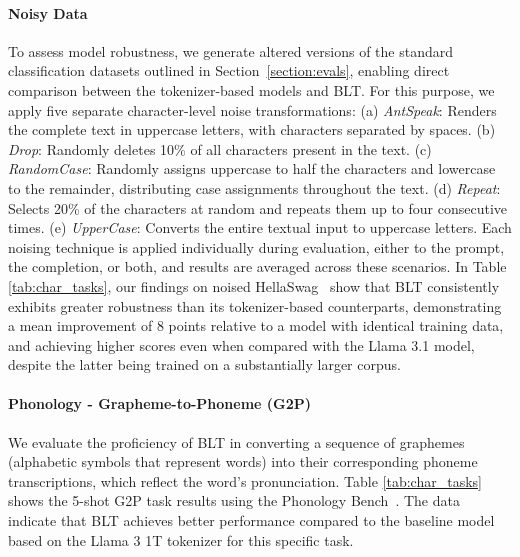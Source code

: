 \paragraph{Noisy Data} To assess model robustness, we generate altered versions of the standard classification datasets outlined in Section~\ref{section:evals}, enabling direct comparison between the tokenizer-based models and {\textsc BLT}. For this purpose, we apply five separate character-level noise transformations: (a) \textit{AntSpeak}: Renders the complete text in uppercase letters, with characters separated by spaces. (b) \textit{Drop}: Randomly deletes 10\% of all characters present in the text. (c) \textit{RandomCase}: Randomly assigns uppercase to half the characters and lowercase to the remainder, distributing case assignments throughout the text. (d) \textit{Repeat}: Selects 20\% of the characters at random and repeats them up to four consecutive times. (e) \textit{UpperCase}: Converts the entire textual input to uppercase letters. Each noising technique is applied individually during evaluation, either to the prompt, the completion, or both, and results are averaged across these scenarios. In Table \ref{tab:char_tasks}, our findings on noised HellaSwag~\citep{Eval_hellaswag} show that {\textsc BLT} consistently exhibits greater robustness than its tokenizer-based counterparts, demonstrating a mean improvement of 8 points relative to a model with identical training data, and achieving higher scores even when compared with the Llama 3.1 model, despite the latter being trained on a substantially larger corpus.

\paragraph{Phonology - Grapheme-to-Phoneme (G2P)} We evaluate the proficiency of {\textsc BLT} in converting a sequence of graphemes (alphabetic symbols that represent words) into their corresponding phoneme transcriptions, which reflect the word's pronunciation. Table \ref{tab:char_tasks} shows the 5-shot G2P task results using the Phonology Bench~\citep{suvarna2024phonologybench}. The data indicate that {\textsc BLT} achieves better performance compared to the baseline model based on the Llama 3 1T tokenizer for this specific task.

